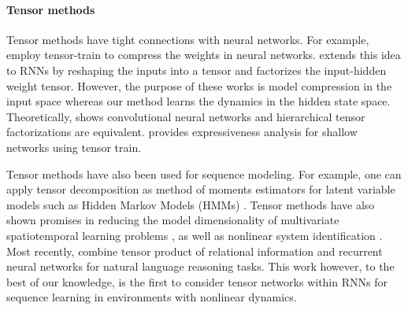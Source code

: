 \paragraph{Tensor methods}
Tensor methods  have tight connections with neural networks. For example,  \citep{novikov2015tensorizing, stoudenmire2016supervised} employ tensor-train to compress the weights in neural networks.  \citep{yang2017tensor}  extends this idea to RNNs by reshaping  the inputs  into a  tensor and factorizes the input-hidden weight tensor. However, the purpose of these works is model compression in the input space whereas our method learns the dynamics in the hidden state space. Theoretically, \citep{cohen2016expressive} shows convolutional neural networks and  hierarchical tensor factorizations are equivalent. \citep{khrulkov2017expressive} provides expressiveness analysis for shallow networks using tensor train.  


Tensor methods have also been used for sequence modeling. For example, one can apply tensor decomposition as  method of moments estimators for latent variable models such as Hidden Markov Models (HMMs)  \citep{anandkumar2012method}. Tensor methods have also shown promises in reducing the model dimensionality of multivariate spatiotemporal learning problems \citep{yu2016learning}, as well as  nonlinear system identification \citep{decuyper2019decoupling}. Most recently, \cite{schlag2018learning} combine tensor product of relational information and recurrent neural networks for natural language reasoning tasks.  This work however, to the best of our knowledge, is the first to consider tensor networks within RNNs  for sequence learning in environments with nonlinear dynamics.


